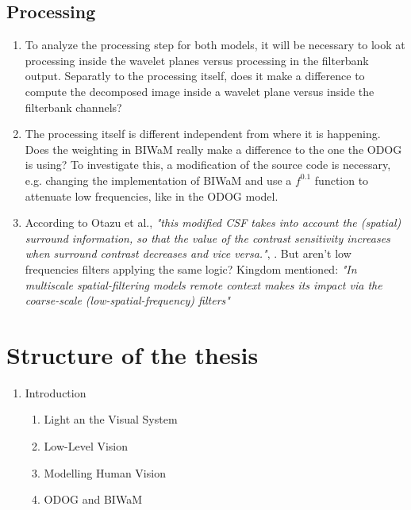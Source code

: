 \subsection*{Processing}
\begin{enumerate}
    \item To analyze the processing step for both models, it will be necessary to look at
    processing inside the wavelet planes versus processing in the filterbank output.
    Separatly to the processing itself, does it make a difference to compute the
    decomposed image inside a wavelet plane versus inside the filterbank channels?
    \item The processing itself is different independent from where it is happening. Does
    the weighting in BIWaM really make a difference to the one the ODOG is using? To
    investigate this, a modification of the source code is necessary, e.g. changing the
    implementation of BIWaM and use a $f^{0.1}$ function to attenuate low frequencies,
    like in the ODOG model.
    \item According to Otazu et al., \emph{"this modified CSF takes into account the
    (spatial) surround information, so that the value of the contrast sensitivity
    increases when surround contrast decreases and vice versa."}, \parencite{Otazu2008}.
    But aren't low frequencies filters applying the same logic? Kingdom mentioned:
    \emph{"In multiscale spatial-filtering models remote context makes its impact via the
    coarse-scale (low-spatial-frequency) filters"}
    \parencite{Kingdom2014}
\end{enumerate}


\newpage

\section{Structure of the thesis}


\begin{enumerate} 
    \item Introduction
    \begin{enumerate}
        \item Light an the Visual System
        \item Low-Level Vision
        \item Modelling Human Vision
        \item ODOG and BIWaM
    \end{enumerate}
    
\end{enumerate}


